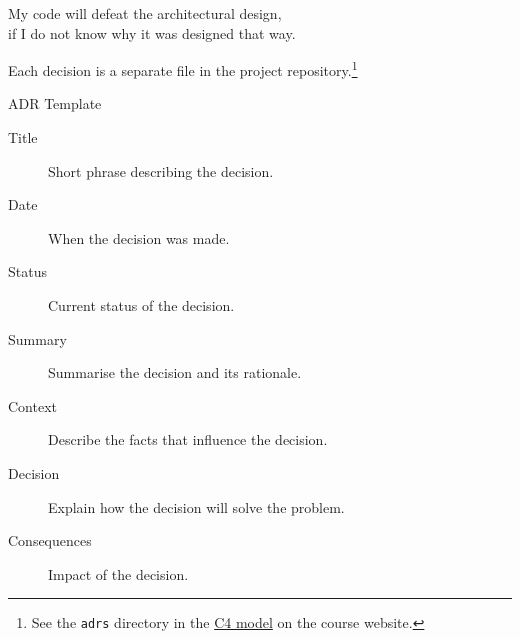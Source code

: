 \documentclass{slide}
\begin{document}
{My code will defeat the architectural design,\\
if I do not know why it was designed that way.}



{Each decision is a separate file in the project repository.\footnote{See the \texttt{adrs} directory
in the \href{https://csse6400.uqcloud.net/resources/c4_model.zip}{C4 model} on the course website.}}


\begin{frame}{ADR Template \cite{nygard-adr}}

\Large{
\begin{description}
    \item[Title] Short phrase describing the decision.
    \item[Date] When the decision was made.
    \item[Status] Current status of the decision.
    \item[Summary] Summarise the decision and its rationale.
    \item[Context] Describe the facts that influence the decision.
    \item[Decision] Explain how the decision will solve the problem.
    \item[Consequences] Impact of the decision.
\end{description}
}

\end{frame}
\end{document}
